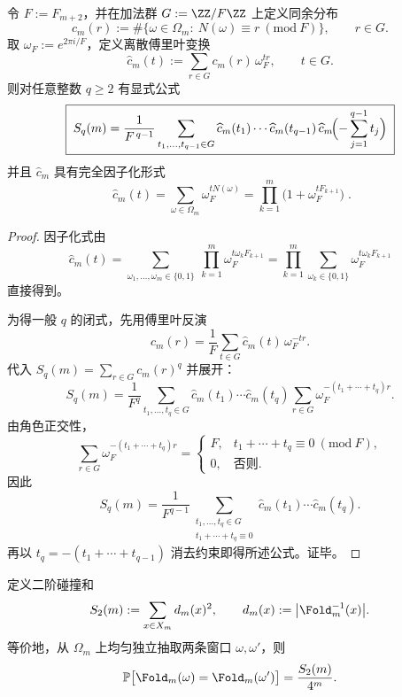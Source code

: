 \begin{proposition}\label{prop:pom-moment-fourier-q}
令 $F:=F_{m+2}$，并在加法群 $G:=\ZZ/F\ZZ$ 上定义同余分布
$$
c_m(r):=\#\{\omega\in\Omega_m:\ N(\omega)\equiv r\ (\mathrm{mod}\ F)\},\qquad r\in G.
$$
取 $\omega_F:=e^{2\pi i/F}$，定义离散傅里叶变换
$$
\widehat c_m(t):=\sum_{r\in G} c_m(r)\,\omega_F^{tr},\qquad t\in G.
$$
则对任意整数 $q\ge 2$ 有显式公式
$$
\boxed{\;
S_q(m)=\frac{1}{F^{\,q-1}}
\sum_{t_1,\dots,t_{q-1}\in G}
\widehat c_m(t_1)\cdots \widehat c_m(t_{q-1})\,
\widehat c_m\!\Bigl(-\sum_{j=1}^{q-1}t_j\Bigr)\;}
$$
并且 $\widehat c_m$ 具有完全因子化形式
$$
\boxed{\;
\widehat c_m(t)=\sum_{\omega\in\Omega_m}\omega_F^{tN(\omega)}
=\prod_{k=1}^m\bigl(1+\omega_F^{tF_{k+1}}\bigr)\; }.
$$
\end{proposition}
\begin{proof}
因子化式由
$$
\widehat c_m(t)=\sum_{\omega_1,\dots,\omega_m\in\{0,1\}}\ \prod_{k=1}^m \omega_F^{t\omega_kF_{k+1}}
=\prod_{k=1}^m\sum_{\omega_k\in\{0,1\}} \omega_F^{t\omega_kF_{k+1}}
$$
直接得到。

为得一般 $q$ 的闭式，先用傅里叶反演
$$
c_m(r)=\frac{1}{F}\sum_{t\in G}\widehat c_m(t)\,\omega_F^{-tr}.
$$
代入 $S_q(m)=\sum_{r\in G}c_m(r)^q$ 并展开：
$$
S_q(m)
=\frac{1}{F^q}\sum_{t_1,\dots,t_q\in G}\widehat c_m(t_1)\cdots\widehat c_m(t_q)\sum_{r\in G}\omega_F^{-(t_1+\cdots+t_q)r}.
$$
由角色正交性，
$$
\sum_{r\in G}\omega_F^{-(t_1+\cdots+t_q)r}
=
\begin{cases}
F,& t_1+\cdots+t_q\equiv 0\ (\mathrm{mod}\ F),\\
0,& \text{否则}.
\end{cases}
$$
因此
$$
S_q(m)=\frac{1}{F^{q-1}}\sum_{\substack{t_1,\dots,t_q\in G\\ t_1+\cdots+t_q\equiv 0}}
\widehat c_m(t_1)\cdots\widehat c_m(t_q).
$$
再以 $t_q=-(t_1+\cdots+t_{q-1})$ 消去约束即得所述公式。证毕。
\end{proof}



\begin{definition}[折叠碰撞矩]\label{def:pom-s2}
定义二阶碰撞和
$$
S_2(m):=\sum_{x\in X_m} d_m(x)^2,
\qquad d_m(x):=\bigl|\Fold_m^{-1}(x)\bigr|.
$$
等价地，从 \(\Omega_m\) 上均匀独立抽取两条窗口 \(\omega,\omega'\)，则
$$
\mathbb{P}\bigl[\Fold_m(\omega)=\Fold_m(\omega')\bigr]=\frac{S_2(m)}{4^m}.
$$
\end{definition}

